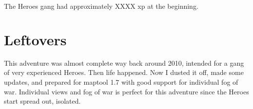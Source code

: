 The Heroes gang had approximately XXXX xp at the beginning.








\clearpage
{}
\section*{Leftovers}
This adventure was almost complete way back around 2010, intended for a gang of very experienced Heroes. Then life happened. Now I dusted it off, made some updates, and prepared for maptool 1.7 with good support for individual fog of war. Individual views and fog of war is perfect for this adventure since the Heroes start spread out, isolated.




































